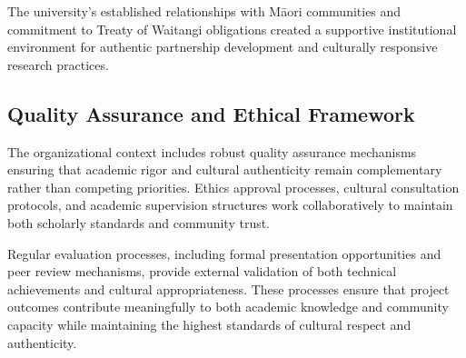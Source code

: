 The university's established relationships with M\=aori communities and commitment to Treaty of Waitangi obligations created a supportive institutional environment for authentic partnership development and culturally responsive research practices.

\subsection{Quality Assurance and Ethical Framework}

The organizational context includes robust quality assurance mechanisms ensuring that academic rigor and cultural authenticity remain complementary rather than competing priorities. Ethics approval processes, cultural consultation protocols, and academic supervision structures work collaboratively to maintain both scholarly standards and community trust.

Regular evaluation processes, including formal presentation opportunities and peer review mechanisms, provide external validation of both technical achievements and cultural appropriateness. These processes ensure that project outcomes contribute meaningfully to both academic knowledge and community capacity while maintaining the highest standards of cultural respect and authenticity.

